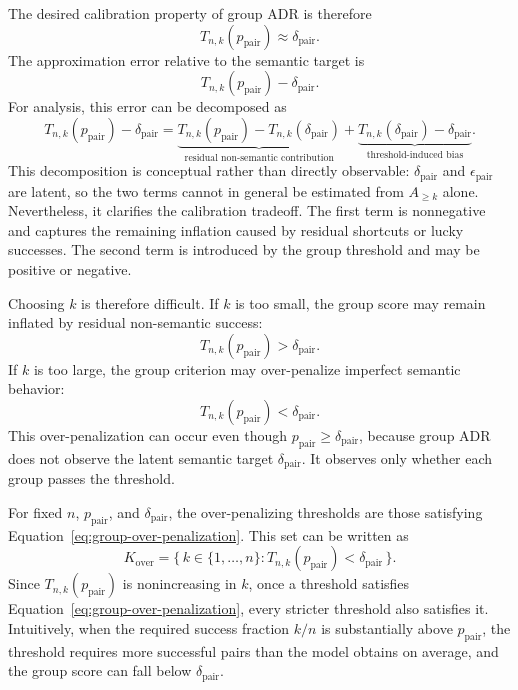 \documentclass[acmsmall,screen,review,anonymous]{acmart}
\begin{document}
The desired calibration property of group ADR is therefore
\[
T_{n,k}(p_{\mathrm{pair}})
\approx
\delta_{\mathrm{pair}}.
\]
The approximation error relative to the semantic target is
\[
T_{n,k}(p_{\mathrm{pair}})
-
\delta_{\mathrm{pair}}.
\]
For analysis, this error can be decomposed as
\[
T_{n,k}(p_{\mathrm{pair}})
-
\delta_{\mathrm{pair}}
= \underbrace{
T_{n,k}(p_{\mathrm{pair}})
-
T_{n,k}(\delta_{\mathrm{pair}})
}_{\text{residual non-semantic contribution}}
+ \underbrace{
T_{n,k}(\delta_{\mathrm{pair}})
- 
\delta_{\mathrm{pair}}
}_{\text{threshold-induced bias}}.
\]
This decomposition is conceptual rather than directly observable:
\(\delta_{\mathrm{pair}}\) and \(\epsilon_{\mathrm{pair}}\) are latent, so
the two terms cannot in general be estimated from \(A_{\ge k}\) alone. Nevertheless,
it clarifies the calibration tradeoff. The first term is nonnegative and
captures the remaining inflation caused by residual shortcuts or lucky
successes. The second term is introduced by the group threshold and may be
positive or negative.

Choosing \(k\) is therefore difficult. If \(k\) is too small, the group score
may remain inflated by residual non-semantic success:
\[
T_{n,k}(p_{\mathrm{pair}})
>
\delta_{\mathrm{pair}}.
\]
If \(k\) is too large, the group criterion may over-penalize imperfect
semantic behavior:
\begin{equation}
\label{eq:group-over-penalization}
T_{n,k}(p_{\mathrm{pair}})
<
\delta_{\mathrm{pair}}.
\end{equation}
This over-penalization can occur even though
\(p_{\mathrm{pair}}\ge \delta_{\mathrm{pair}}\), because group ADR does not
observe the latent semantic target \(\delta_{\mathrm{pair}}\). It observes
only whether each group passes the threshold.

For fixed \(n\), \(p_{\mathrm{pair}}\), and \(\delta_{\mathrm{pair}}\), the
over-penalizing thresholds are those satisfying
Equation~\eqref{eq:group-over-penalization}. This set can be written as
\[
K_{\mathrm{over}}
=
\{\,k\in\{1,\ldots,n\}
:
T_{n,k}(p_{\mathrm{pair}})
<
\delta_{\mathrm{pair}}
\,\}.
\]
Since \(T_{n,k}(p_{\mathrm{pair}})\) is nonincreasing in \(k\), once a
threshold satisfies Equation~\eqref{eq:group-over-penalization}, every
stricter threshold also satisfies it. Intuitively, when the required success
fraction \(k/n\) is substantially above \(p_{\mathrm{pair}}\), the threshold
requires more successful pairs than the model obtains on average, and the
group score can fall below \(\delta_{\mathrm{pair}}\).
\end{document}
